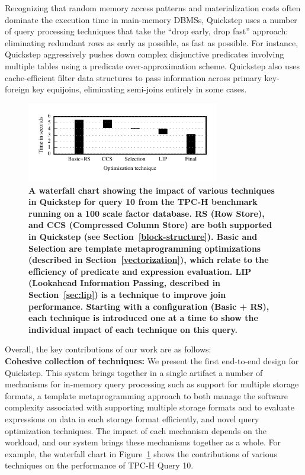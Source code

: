 Recognizing that random memory access patterns and materialization costs often dominate the execution time in main-memory DBMSs, Quickstep uses a number of query processing techniques that take the ``drop early, drop fast'' approach: eliminating redundant rows as early as possible, as fast as possible. For instance, Quickstep aggressively pushes down complex disjunctive predicates involving multiple tables using a %
predicate over-approximation scheme. Quickstep also uses cache-efficient filter data structures to pass information across primary key-foreign key equijoins,  eliminating semi-joins entirely in some cases. 

\begin{figure}
	\centering
	\includegraphics[width=0.75\textwidth]{system/figures/tpch-q10-waterfall.pdf}
	\caption{\textbf{A waterfall chart showing the impact of various techniques in Quickstep for query 10 from the TPC-H benchmark running on a 100 scale factor database. RS (Row Store), and CCS (Compressed Column Store) are both supported in Quickstep (see Section~\ref{block-structure}). Basic and Selection are template metaprogramming optimizations (described in Section~\ref{vectorization}), which relate to the efficiency of predicate and expression evaluation. LIP (Lookahead Information Passing, described in Section~\ref{sec:lip}) is a technique to improve join performance. Starting with a configuration (Basic + RS), each technique is introduced one at a time to show the individual impact of each technique on this query.}}
	\label{fig:tpch-q10-waterfall}
\end{figure}

Overall, the key contributions of our work are as follows:\\

\textbf{Cohesive collection of techniques:} We present the first end-to-end design for Quickstep. This system brings together in a single artifact a number of mechanisms for in-memory query processing such as support for multiple storage formats, a template metaprogramming approach to both manage the software complexity associated with supporting multiple storage formats and to evaluate expressions on data in each storage format efficiently, and novel query optimization techniques.
The impact of each mechanism depends on the workload, and our system brings these mechanisms together as a whole.
For example, the waterfall chart in Figure~\ref{fig:tpch-q10-waterfall} shows the contributions of various techniques on the performance of TPC-H Query 10.

